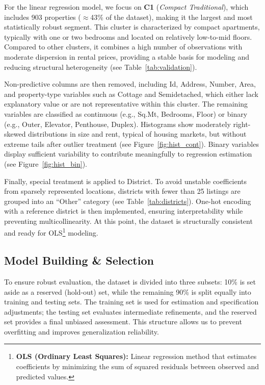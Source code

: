 \documentclass[10pt,a4paper,twocolumn]{article}
\newcommand{\cluster}[1]{\textbf{C#1}}
\newcommand{\seg}[1]{\textit{#1}}          %
\begin{document}
For the linear regression model, we focus on \cluster{1} (\seg{Compact Traditional}), which includes 903 properties ($\approx$43\% of the dataset), making it the largest and most statistically robust segment. This cluster is characterized by compact apartments, typically with one or two bedrooms and located on relatively low-to-mid floors. Compared to other clusters, it combines a high number of observations with moderate dispersion in rental prices, providing a stable basis for modeling and reducing structural heterogeneity (see Table~\ref{tab:validation}).

Non-predictive columns are then removed, including Id, Address, Number, Area, and property-type variables such as Cottage and Semidetached, which either lack explanatory value or are not representative within this cluster. The remaining variables are classified as continuous (e.g., Sq.Mt, Bedrooms, Floor) or binary (e.g., Outer, Elevator, Penthouse, Duplex). Histograms show moderately right-skewed distributions in size and rent, typical of housing markets, but without extreme tails after outlier treatment (see Figure~\ref{fig:hist_cont}). Binary variables display sufficient variability to contribute meaningfully to regression estimation (see Figure~\ref{fig:hist_bin}).

Finally, special treatment is applied to District. To avoid unstable coefficients from sparsely represented locations, districts with fewer than 25 listings are grouped into an “Other” category (see Table~\ref{tab:districts}). One-hot encoding with a reference district is then implemented, ensuring interpretability while preventing multicollinearity. At this point, the dataset is structurally consistent and ready for OLS\footnote{\textbf{OLS (Ordinary Least Squares):} Linear regression method that estimates coefficients by minimizing the sum of squared residuals between observed and predicted values.} modeling.


\subsection{Model Building \& Selection}

To ensure robust evaluation, the dataset is divided into three subsets: 10\% is set aside as a reserved (hold-out) set, while the remaining 90\% is split equally into training and testing sets. The training set is used for estimation and specification adjustments; the testing set evaluates intermediate refinements, and the reserved set provides a final unbiased assessment. This structure allows us to prevent overfitting and improves generalization reliability. 
\end{document}
